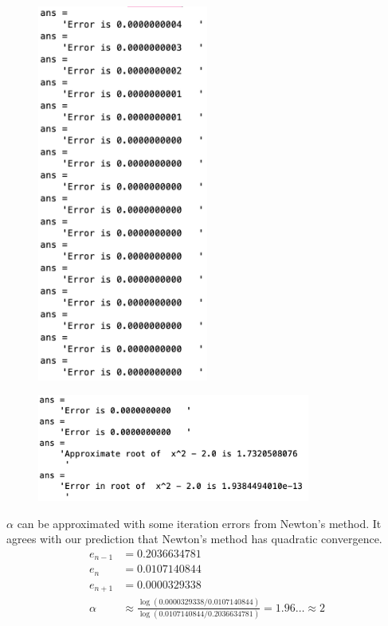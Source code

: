 \documentclass[newpage]{homework}
\begin{document}
\begin{figure}[htbp]
	\centering
	\includegraphics[width=0.5\textwidth]{3biv.png}
\end{figure}

\begin{figure}[htbp]
	\centering
	\includegraphics[width=0.8\textwidth]{3bv.png}
\end{figure}

\question
$\alpha$ can be approximated with some iteration errors from Newton's method. It agrees with our prediction that Newton's method has quadratic convergence.
\begin{align*}
	e_{n-1}	&=	0.2036634781	\\
	e_{n}	&=	0.0107140844	\\
	e_{n+1}	&=	0.0000329338	\\
	\alpha	&\approx	\frac{\log(0.0000329338/0.0107140844)}{\log(0.0107140844/0.2036634781)} = 1.96\dots \approx \boxed{2}
\end{align*}
\end{document}
